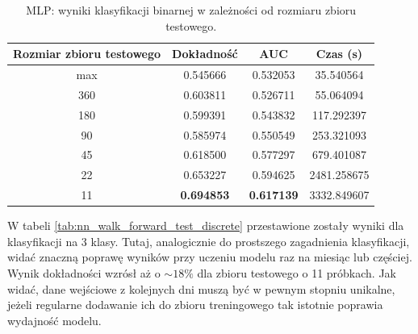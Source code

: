 \documentclass[a4paper, twoside, 11pt, openright]{article}
\begin{document}
\begin{table}[H]
    \centering
    \begin{tabular}{|c|c|c|c|}
    \hline
        \textbf{Rozmiar zbioru testowego} & \textbf{Dokładność} &  \textbf{AUC} &  \textbf{Czas (s)} \\ \hline 
max                           &  0.545666 &  0.532053 &   35.540564 \\  \hline
360                         &  0.603811 &  0.526711 &    55.064094 \\  \hline
180                         &  0.599391 &  0.543832 &   117.292397 \\  \hline
90                         &  0.585974 &  0.550549 &   253.321093 \\  \hline
45                         &  0.618500 &  0.577297 &   679.401087 \\  \hline
22                          &  0.653227 &  0.594625 &  2481.258675 \\  \hline
11                          &  \textbf{0.694853} &  \textbf{0.617139} &  3332.849607 \\ \hline
    \end{tabular}
    \caption{MLP: wyniki klasyfikacji binarnej w zależności od rozmiaru zbioru testowego.}
    \label{tab:nn_walk_forward_test_binary}
\end{table}

W tabeli \ref{tab:nn_walk_forward_test_discrete} przestawione zostały wyniki dla klasyfikacji na 3 klasy. Tutaj, analogicznie do prostszego zagadnienia klasyfikacji, widać znaczną poprawę wyników przy uczeniu modelu raz na miesiąc lub częściej. Wynik dokładności wzrósł aż o $\sim 18\%$ dla zbioru testowego o 11 próbkach. Jak widać, dane wejściowe z kolejnych dni muszą być w pewnym stopniu unikalne, jeżeli regularne dodawanie ich do zbioru treningowego tak istotnie poprawia wydajność modelu.
\end{document}
